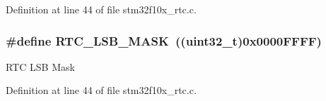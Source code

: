 Definition at line 44 of file stm32f10x\+\_\+rtc.\+c.

\subsubsection[{\texorpdfstring{R\+T\+C\+\_\+\+L\+S\+B\+\_\+\+M\+A\+SK}{RTC_LSB_MASK}}]{\setlength{\rightskip}{0pt plus 5cm}\#define R\+T\+C\+\_\+\+L\+S\+B\+\_\+\+M\+A\+SK~(({\bf uint32\+\_\+t})0x0000\+F\+F\+F\+F)}\hypertarget{group___r_t_c___private___defines_gae19d75bb0ecb5e93d97e026a04d4854f}{}\label{group___r_t_c___private___defines_gae19d75bb0ecb5e93d97e026a04d4854f}
R\+TC L\+SB Mask 

Definition at line 44 of file stm32f10x\+\_\+rtc.\+c.

